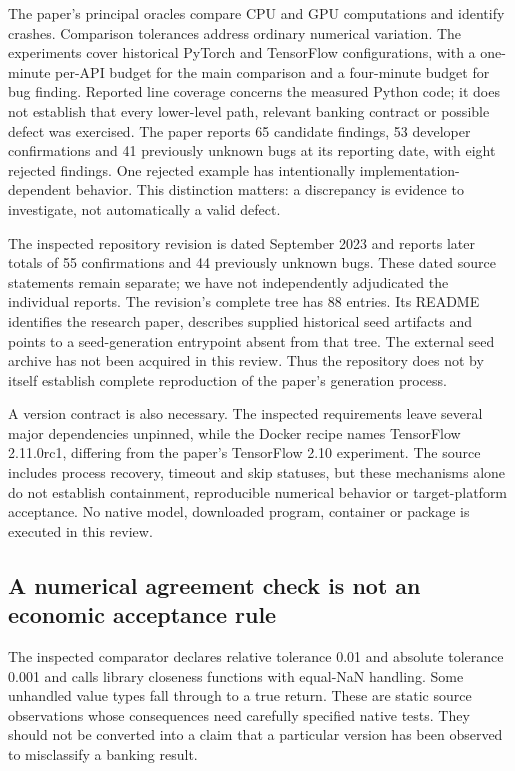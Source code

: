 The paper's principal oracles compare CPU and GPU computations and identify crashes. Comparison tolerances address ordinary numerical variation. The experiments cover historical PyTorch and TensorFlow configurations, with a one-minute per-API budget for the main comparison and a four-minute budget for bug finding. Reported line coverage concerns the measured Python code; it does not establish that every lower-level path, relevant banking contract or possible defect was exercised. The paper reports 65 candidate findings, 53 developer confirmations and 41 previously unknown bugs at its reporting date, with eight rejected findings. One rejected example has intentionally implementation-dependent behavior. This distinction matters: a discrepancy is evidence to investigate, not automatically a valid defect.~\citep{exec24_fuzzing_original}

The inspected repository revision is dated September 2023 and reports later totals of 55 confirmations and 44 previously unknown bugs. These dated source statements remain separate; we have not independently adjudicated the individual reports. The revision's complete tree has 88 entries. Its README identifies the research paper, describes supplied historical seed artifacts and points to a seed-generation entrypoint absent from that tree. The external seed archive has not been acquired in this review. Thus the repository does not by itself establish complete reproduction of the paper's generation process.~\citep{exec24_titanfuzz_source}

A version contract is also necessary. The inspected requirements leave several major dependencies unpinned, while the Docker recipe names TensorFlow 2.11.0rc1, differing from the paper's TensorFlow 2.10 experiment. The source includes process recovery, timeout and skip statuses, but these mechanisms alone do not establish containment, reproducible numerical behavior or target-platform acceptance. No native model, downloaded program, container or package is executed in this review.~\citep{exec24_titanfuzz_source}

\subsection{A numerical agreement check is not an economic acceptance rule}
The inspected comparator declares relative tolerance 0.01 and absolute tolerance 0.001 and calls library closeness functions with equal-NaN handling. Some unhandled value types fall through to a true return. These are static source observations whose consequences need carefully specified native tests. They should not be converted into a claim that a particular version has been observed to misclassify a banking result.~\citep{exec24_titanfuzz_source}


